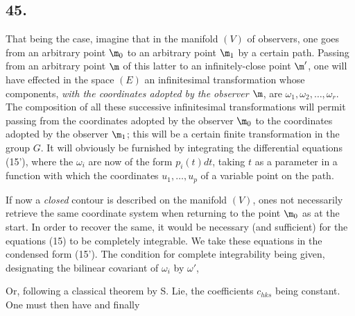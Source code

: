 \subsection*{45.}

That being the case, imagine that in the manifold $(V)$ of observers, one goes from an arbitrary point $\m_0$ to an arbitrary point $\m_1$ by a certain path. Passing from an arbitrary point $\m$ of this latter to an infinitely-close point $\m'$, one will have effected in the space $(E)$ an infinitesimal transformation whose components, \textit{with the coordinates adopted by the observer $\m$}, are $\omega_1, \omega_2, \dots, \omega_r$. The composition of all these successive infinitesimal transformations will permit passing from the coordinates adopted by the observer $\m_0$ to the coordinates adopted by the observer $\m_1$; this will be a certain finite transformation in the group $G$. It will obviously be furnished by integrating the differential equations (15'), where the $\omega_i$ are now of the form $p_i(t) dt$, taking $t$ as a parameter in a function with which the coordinates $u_1, \dots, u_p$ of a variable point on the path.

If now a \textit{closed} contour is described on the manifold $(V)$, ones not necessarily retrieve the same coordinate system when returning to the point $\m_0$ as at the start. In order to recover the same, it would be necessary (and sufficient) for the equations (15) to be completely integrable. We take these equations in the condensed form (15'). The condition for complete integrability being given, designating the bilinear covariant of $\omega_i$ by $\omega'$,

Or, following a classical theorem by S. Lie,
the coefficients $c_{hks}$ being constant. One must then have
and finally
